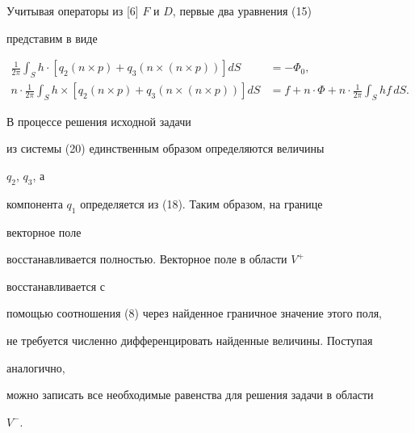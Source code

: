  


Учитывая операторы из [6] $F$ и $D$, первые два уравнения (15) 


представим в виде 


\begin{equation} 


\begin{split} 


\frac{1}{2\pi}\int_S h\cdot[q_2(n\times p)+q_3(n\times(n\times p))] 


dS&=-\Phi_0,\\ 


n\cdot\frac{1}{2\pi}\int_S h\times[q_2(n\times p)+ 


q_3(n\times(n\times p))]dS&=f+n\cdot\Phi+ 


n\cdot\frac{1}{2\pi}\int_S h f\,dS. 


\end{split} 


\end{equation} 


 


В процессе решения исходной задачи


из системы (20) единственным образом определяются величины 


$q_2$, $q_3$, а 


компонента $q_1$ определяется из (18). Таким образом, на границе 


векторное поле 


восстанавливается полностью. Векторное поле в области $V^+$ 


восстанавливается  с  


помощью соотношения (8) через найденное граничное значение этого поля, 


не  требуется численно дифференцировать найденные величины. Поступая 


аналогично, 


можно записать все необходимые равенства для решения задачи в области 


$V^-$. 


 


